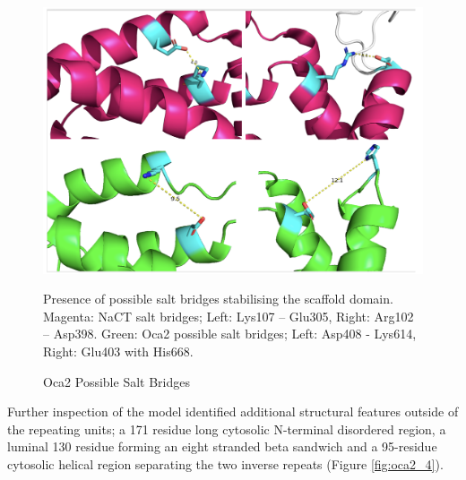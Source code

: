 \begin{figure}[th!]
    \centering
    \includegraphics[width=150mm, scale=0.75]{oca2/oca2_3.png}
    \caption{Oca2 Possible Salt Bridges}
    \label{fig:oca2_3}
    \small
    Presence of possible salt bridges stabilising the scaffold domain.  Magenta: NaCT salt bridges; Left: Lys107 – Glu305, Right: Arg102 – Asp398. Green: Oca2 possible salt bridges; Left: Asp408 - Lys614, Right: Glu403 with His668.
\end{figure}
 

Further inspection of the model identified additional structural features outside of the repeating units; a 171 residue long cytosolic N-terminal disordered region, a luminal 130 residue forming an eight stranded beta sandwich and a 95-residue cytosolic helical region separating the two inverse repeats (Figure \ref{fig:oca2_4}).

